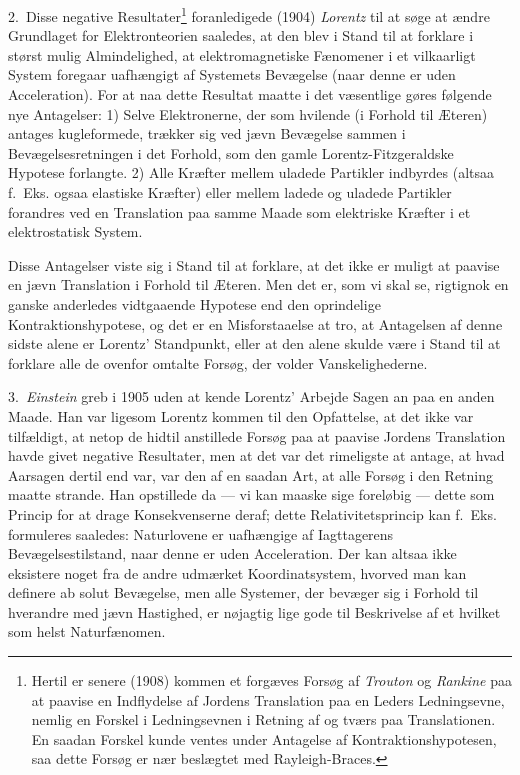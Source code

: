 \documentclass[12pt,a4paper]{article}
\newcommand{\opage}[1]{\marginnote{\footnotesize\textit{[#1]}}}
\begin{document}
\opage{19} %
\setcounter{footnote}{0}%
2.\ Disse negative Resultater\footnote{Hertil er senere (1908) kommen et
forgæves Forsøg af \emph{Trouton} og \emph{Rankine} paa at paavise en
Indflydelse af Jordens Translation paa en Leders Ledningsevne, nemlig en
Forskel i Ledningsevnen i Retning af og tværs paa Translationen. En
saadan Forskel kunde ventes under Antagelse af Kontraktionshypotesen,
saa dette Forsøg er nær beslægtet med Rayleigh-Braces.} foranledigede
(1904) \emph{Lorentz} til at søge at ændre Grundlaget for
Elektronteorien saaledes, at den blev i Stand til at forklare i størst
mulig Almindelighed, at elektromagnetiske Fænomener i et vilkaarligt
System foregaar uafhængigt af Systemets Bevægelse (naar denne er uden
Acceleration). For at naa dette Resultat maatte i det væsentlige gøres
følgende nye Antagelser: 1) Selve Elektronerne, der som hvilende (i
Forhold til Æteren) antages kugleformede, trækker sig ved jævn
Bevægelse sammen i Bevægelsesretningen i det Forhold, som den gamle
Lorentz-Fitzgeraldske Hypotese forlangte. 2) Alle Kræfter mellem
uladede Partikler indbyrdes (altsaa f.~Eks. ogsaa elastiske Kræfter)
eller mellem ladede og uladede Partikler forandres ved en Translation
paa samme Maade som elektriske Kræfter i et elektrostatisk System.

Disse Antagelser viste sig i Stand til at forklare, at det ikke er
muligt at paavise en jævn Translation i Forhold til Æteren. Men det er,
som vi skal se, rigtignok en ganske anderledes vidtgaaende Hypotese end
den oprindelige Kontraktionshypotese, og det er en Misforstaaelse at
tro, at Antagelsen af denne sidste alene er Lorentz' Standpunkt, eller
at den alene skulde være i Stand til at forklare alle de ovenfor
omtalte Forsøg, der volder Vanskelighederne.

3.\ \emph{Einstein} greb i 1905 uden at kende Lorentz' Arbejde Sagen an
paa en anden Maade. Han var ligesom Lorentz kommen til den Opfattelse,
at det ikke var tilfældigt, at netop de hidtil anstillede Forsøg paa at
paavise Jordens Translation havde givet negative Resultater, men at det
var det rimeligste at antage, at hvad Aarsagen dertil end var, var den
af en saadan Art, at alle Forsøg i den Retning maatte strande. Han
opstillede da --- vi kan maaske sige foreløbig --- dette som Princip
for at drage Konsekvenserne deraf; dette Relativitetsprincip kan
f.~Eks. formuleres saaledes: Naturlovene er uafhængige af Iagttagerens
Bevægelsestilstand, naar denne er uden Acceleration. Der kan altsaa
ikke eksistere noget fra de andre udmærket Koordinatsystem, hvorved man
kan definere ab\-%
\opage{20}%
\setcounter{footnote}{0}%
solut Bevægelse, men alle Systemer, der bevæger sig i Forhold til
hverandre med jævn Hastighed, er nøjagtig lige gode til Beskrivelse af
et hvilket som helst Naturfænomen.
\end{document}
